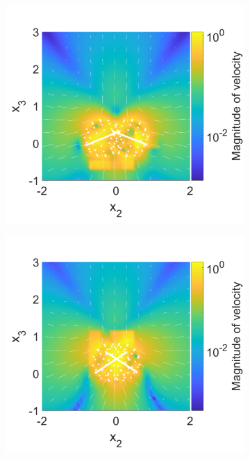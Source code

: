 \begin{figure}
\begin{subfigure}[b]{0.328\textwidth}
    \caption[]{\label{fig:PairB}}
\end{subfigure}
\begin{subfigure}[b]{0.328\textwidth}
    \centering
    \includegraphics[width=\textwidth]{Images/squirmers/Pair-3.pdf}
    \caption[]{\label{fig:PairC}}
\end{subfigure}
\begin{subfigure}[b]{0.328\textwidth}
    \centering
    \includegraphics[width=\textwidth]{Images/squirmers/Pair-4.pdf}

\end{subfigure}
\end{figure}
